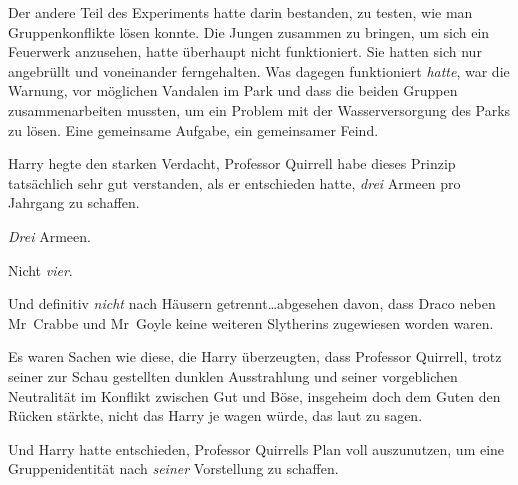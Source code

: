Der andere Teil des Experiments hatte darin bestanden, zu testen, wie man Gruppenkonflikte lösen konnte. Die Jungen zusammen zu bringen, um sich ein Feuerwerk anzusehen, hatte überhaupt nicht funktioniert. Sie hatten sich nur angebrüllt und voneinander ferngehalten. Was dagegen funktioniert \emph{hatte}, war die Warnung, vor möglichen Vandalen im Park und dass die beiden Gruppen zusammenarbeiten mussten, um ein Problem mit der Wasserversorgung des Parks zu lösen. Eine gemeinsame Aufgabe, ein gemeinsamer Feind.

Harry hegte den starken Verdacht, Professor Quirrell habe dieses Prinzip tatsächlich sehr gut verstanden, als er entschieden hatte, \emph{drei} Armeen pro Jahrgang zu schaffen.

\emph{Drei} Armeen.

Nicht \emph{vier}.

Und definitiv \emph{nicht} nach Häusern getrennt…abgesehen davon, dass Draco neben Mr~Crabbe und Mr~Goyle keine weiteren Slytherins zugewiesen worden waren.

Es waren Sachen wie diese, die Harry überzeugten, dass Professor Quirrell, trotz seiner zur Schau gestellten dunklen Ausstrahlung und seiner vorgeblichen Neutralität im Konflikt zwischen Gut und Böse, insgeheim doch dem Guten den Rücken stärkte, nicht das Harry je wagen würde, das laut zu sagen.

Und Harry hatte entschieden, Professor Quirrells Plan voll auszunutzen, um eine Gruppenidentität nach \emph{seiner} Vorstellung zu schaffen.

